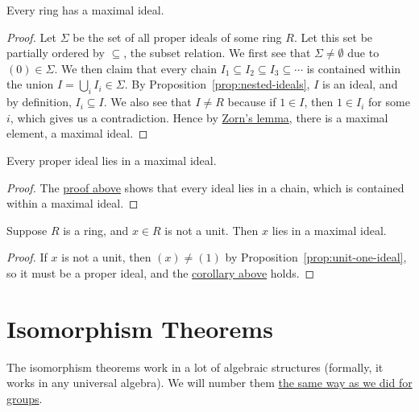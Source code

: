 \begin{theorem}\label{thm:maximal-ideal-exists}
    Every ring has a maximal ideal.
\end{theorem}
\begin{proof}
    Let \(\Sigma\) be the set of all proper ideals of some ring \(R\).
    Let this set be partially ordered by \(\subseteq\), the subset relation.
    We first see that \(\Sigma\neq\emptyset\) due to \((0) \in \Sigma\).
    We then claim that every chain \(I_1 \subseteq I_2 \subseteq I_3 \subseteq \cdots\)
    is contained within the union \(I = \bigcup_i I_i \in \Sigma\).
    By Proposition~\ref{prop:nested-ideals}, \(I\) is an ideal,
    and by definition, \(I_i \subseteq I\).
    We also see that \(I \neq R\) because if \(1 \in I\),
    then \(1 \in I_i\) for some \(i\), which gives us a contradiction.
    Hence by \hyperref[ax:zorn]{Zorn's lemma}, there is a maximal element, a maximal ideal.
\end{proof}
\begin{corollary}\label{cor:proper-in-maximal}
    Every proper ideal lies in a maximal ideal.
\end{corollary}
\begin{proof}
    The \hyperref[thm:maximal-ideal-exists]{proof above} shows that
    every ideal lies in a chain,
    which is contained within a maximal ideal.
\end{proof}
\begin{corollary}
    Suppose \(R\) is a ring, and \(x \in R\) is not a unit.
    Then \(x\) lies in a maximal ideal.
\end{corollary}
\begin{proof}
    If \(x\) is not a unit,
    then \((x) \neq (1)\) by Proposition~\ref{prop:unit-one-ideal},
    so it must be a proper ideal,
    and the \hyperref[cor:proper-in-maximal]{corollary above} holds.
\end{proof}


\section{Isomorphism Theorems}

\begin{remark}
    The isomorphism theorems work in a lot of algebraic structures
    (formally, it works in any universal algebra).
    We will number them \hyperref[rmk:iso-numbering]{the same way as we did for groups}.
\end{remark}

